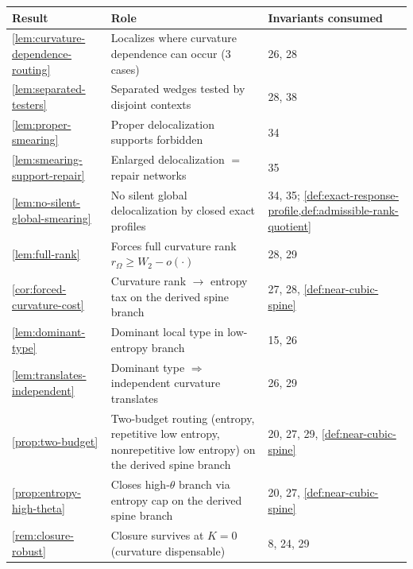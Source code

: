 \documentclass[11pt]{article}
\begin{document}
{\small
\begin{longtable}{L{0.31\textwidth} L{0.42\textwidth} L{0.17\textwidth}}
\toprule
\textbf{Result} & \textbf{Role} & \textbf{Invariants consumed} \\
\midrule
\endhead
\cref{lem:curvature-dependence-routing} & Localizes where curvature dependence can occur (3 cases) & 26, 28 \\
\cref{lem:separated-testers} & Separated wedges tested by disjoint contexts & 28, 38 \\
\cref{lem:proper-smearing} & Proper delocalization supports forbidden & 34 \\
\cref{lem:smearing-support-repair} & Enlarged delocalization $=$ repair networks & 35 \\
\cref{lem:no-silent-global-smearing} & No silent global delocalization by closed exact profiles & 34, 35; \cref{def:exact-response-profile,def:admissible-rank-quotient} \\
\cref{lem:full-rank} & Forces full curvature rank $r_\Omega\ge W_2-o(\cdot)$ & 28, 29 \\
\cref{cor:forced-curvature-cost} & Curvature rank $\to$ entropy tax on the derived spine branch & 27, 28, \cref{def:near-cubic-spine} \\
\cref{lem:dominant-type} & Dominant local type in low-entropy branch & 15, 26 \\
\cref{lem:translates-independent} & Dominant type $\Rightarrow$ independent curvature translates & 26, 29 \\
\cref{prop:two-budget} & Two-budget routing (entropy, repetitive low entropy, nonrepetitive low entropy) on the derived spine branch & 20, 27, 29, \cref{def:near-cubic-spine} \\
\cref{prop:entropy-high-theta} & Closes high-$\theta$ branch via entropy cap on the derived spine branch & 20, 27, \cref{def:near-cubic-spine} \\
\cref{rem:closure-robust} & Closure survives at $K=0$ (curvature dispensable) & 8, 24, 29 \\
\bottomrule
\end{longtable}
}
\end{document}
